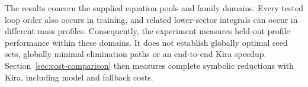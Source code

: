 The results concern the supplied equation pools and family domains.
Every tested loop order also occurs in training, and related
lower-sector integrals can occur in different mass profiles.
Consequently, the experiment measures held-out profile performance
within these domains. It does not establish globally optimal seed
sets, globally minimal elimination paths or an end-to-end Kira
speedup.
Section~\ref{sec:cost-comparison} then measures complete symbolic reductions with Kira, including model and fallback costs.
\FloatBarrier
